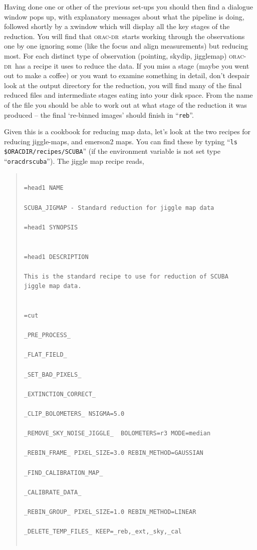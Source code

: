 \documentclass[twoside,11pt]{article}
\newenvironment{myquote}{\begin{quote}\begin{small}}{\end{small}\end{quote}}
\newcommand{\oracdr}{\xref{\textsc{orac-dr}}{sun231}{}}
\newcommand{\xref}[3]{#1}
\renewcommand{\_}{\texttt{\symbol{95}}}
\begin{document}
Having done one or other of the previous set-ups you should then find
a dialogue window pops up, with explanatory messages about what the
pipeline is doing, followed shortly by a xwindow which will display
all the key stages of the reduction.  You will find that \oracdr\
starts working through the observations one by one ignoring some (like
the focus and align measurements) but reducing most.  For each
distinct type of observation (pointing, skydip, jigglemap) \oracdr\
has a recipe it uses to reduce the data.  If you miss a stage (maybe
you went out to make a coffee) or you want to examine something in
detail, don't despair look at the output directory for the reduction,
you will find many of the final reduced files and intermediate stages
eating into your disk space.  From the name of the file you should be
able to work out at what stage of the reduction it was produced -- the
final `re-binned images' should finish in ``\texttt{\_reb}''.

Given this is a cookbook for reducing map data, let's look at the two
recipes for reducing jiggle-maps, and emerson2 maps.  You can find
these by typing ``\texttt{ls \$ORAC\_DIR/recipes/SCUBA}'' (if the environment
variable is not set type ``\texttt{oracdr\_scuba}'').  The jiggle map recipe
reads,

\begin{myquote}
\begin{verbatim}

=head1 NAME

SCUBA_JIGMAP - Standard reduction for jiggle map data

=head1 SYNOPSIS


=head1 DESCRIPTION

This is the standard recipe to use for reduction of SCUBA 
jiggle map data.


=cut

_PRE_PROCESS_

_FLAT_FIELD_

_SET_BAD_PIXELS_

_EXTINCTION_CORRECT_

_CLIP_BOLOMETERS_ NSIGMA=5.0

_REMOVE_SKY_NOISE_JIGGLE_  BOLOMETERS=r3 MODE=median

_REBIN_FRAME_ PIXEL_SIZE=3.0 REBIN_METHOD=GAUSSIAN

_FIND_CALIBRATION_MAP_

_CALIBRATE_DATA_

_REBIN_GROUP_ PIXEL_SIZE=1.0 REBIN_METHOD=LINEAR

_DELETE_TEMP_FILES_ KEEP=_reb,_ext,_sky,_cal


\end{verbatim}
\end{myquote}
\end{document}

